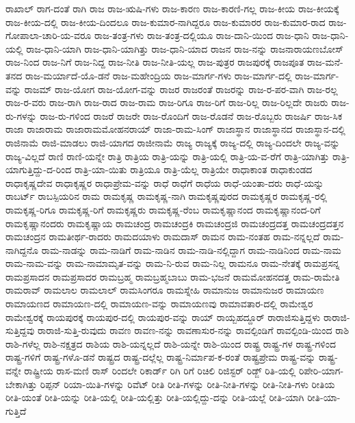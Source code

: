 {ರಾಖಾಲ್
ರಾಗ-ದಂತೆ
ರಾಗಿ
ರಾಜ
ರಾಜ-ಋಷಿ-ಗಳು
ರಾಜ-ಕಾರಣ
ರಾಜ-ಕಾರಣಿ-ಗಲ್ಲ
ರಾಜ-ಕೀಯ
ರಾಜ-ಕೀಯಕ್ಕೆ
ರಾಜ-ಕೀಯ-ದಲ್ಲಿ
ರಾಜ-ಕೀಯ-ದಿಂದಲೂ
ರಾಜ-ಕುಮಾರ-ನಾಗಿದ್ದರೂ
ರಾಜ-ಕುಮಾರರ
ರಾಜ-ಕುಮಾರ-ರಾದ
ರಾಜ-ಗೋಪಾಲಾ-ಚಾರಿ-ಯ-ವರೂ
ರಾಜ-ತಂತ್ರ-ಗಳು
ರಾಜ-ತಂತ್ರ-ದಲ್ಲಿಯೂ
ರಾಜ-ದಾನಿ-ಯಿಂದ
ರಾಜ-ಧಾನಿ
ರಾಜ-ಧಾನಿ-ಯಲ್ಲಿ
ರಾಜ-ಧಾನಿ-ಯಾಗಿ
ರಾಜ-ಧಾನಿ-ಯಾಗಿತ್ತು
ರಾಜ-ಧಾನಿ-ಯಾದ
ರಾಜನ
ರಾಜ-ನನ್ನು
ರಾಜನಾರಾಯಣಬೋಸ್
ರಾಜ-ನಿಂದ
ರಾಜ-ನಿಗೆ
ರಾಜ-ನಿದ್ದ
ರಾಜ-ನೀತಿ
ರಾಜ-ನೀತಿ-ಯಲ್ಲ
ರಾಜ-ಪುತ್ರರ
ರಾಜಪುರಕ್ಕೆ
ರಾಜಪೂತ
ರಾಜ-ಮನೆ-ತನದ
ರಾಜ-ಮರ್ಯಾದೆ-ಯೊ-ಡನೆ
ರಾಜ-ಮಹೇಂದ್ರಿಯ
ರಾಜ-ಮಾರ್ಗ-ಗಳು
ರಾಜ-ಮಾರ್ಗ-ದಲ್ಲಿ
ರಾಜ-ಮಾರ್ಗ-ವನ್ನು
ರಾಜಮ್
ರಾಜ-ಯೋಗ
ರಾಜ-ಯೋಗ-ವನ್ನು
ರಾಜರ
ರಾಜರಂತೆ
ರಾಜರನ್ನು
ರಾಜ-ರ-ಪರ-ವಾಗಿ
ರಾಜ-ರಲ್ಲ
ರಾಜ-ರ-ವರು
ರಾಜ-ರಾಗಿ
ರಾಜ-ರಾದ
ರಾಜ-ರಾಮ
ರಾಜ-ರಿಗೂ
ರಾಜ-ರಿಗೆ
ರಾಜ-ರಿಲ್ಲ
ರಾಜ-ರಿಲ್ಲದೇ
ರಾಜರು
ರಾಜ-ರು-ಗಳನ್ನು
ರಾಜ-ರು-ಗಳಿಂದ
ರಾಜರೆ
ರಾಜರೇ
ರಾಜ-ರೊಂದಿಗೆ
ರಾಜ-ರೊಡನೆ
ರಾಜ-ರೊಬ್ಬರು
ರಾಜರ್ಷಿ
ರಾಜ-ಸಿಕ
ರಾಜಾ
ರಾಜಾರಾಮ
ರಾಜಾರಾಮಮೋಹನರಾಯ್
ರಾಜಾ-ರಾಮ-ಸಿಂಗ್
ರಾಜಾಸ್ಥಾನ
ರಾಜಾಸ್ಥಾನದ
ರಾಜಾಸ್ಥಾನ-ದಲ್ಲಿ
ರಾಜಿನಾಮೆ
ರಾಜಿ-ಮಾಡಲು
ರಾಜಿ-ಯಾಗದ
ರಾಜೀನಾಮೆ
ರಾಜ್ಯ
ರಾಜ್ಯಕ್ಕೆ
ರಾಜ್ಯ-ದಲ್ಲಿ
ರಾಜ್ಯ-ದಿಂದಲೇ
ರಾಜ್ಯ-ವನ್ನು
ರಾಜ್ಯ-ವಿಲ್ಲದೆ
ರಾಣಿ
ರಾಣಿ-ಯನ್ನೇ
ರಾತ್ರಿ
ರಾತ್ರಿಯ
ರಾತ್ರಿ-ಯನ್ನು
ರಾತ್ರಿ-ಯಲ್ಲಿ
ರಾತ್ರಿ-ಯ-ವ-ರೆಗೆ
ರಾತ್ರಿ-ಯಾಗಿತ್ತು
ರಾತ್ರಿ-ಯಾಗುತ್ತಿದ್ದು-ದ-ರಿಂದ
ರಾತ್ರಿ-ಯಾ-ಯಿತು
ರಾತ್ರಿಯೂ
ರಾತ್ರಿ-ಯೆಲ್ಲ
ರಾತ್ರಿಯೇ
ರಾಧಾಕಾಂತ
ರಾಧಾಕುಂಡದ
ರಾಧಾಕೃಷ್ಣದೇವ
ರಾಧಾಕೃಷ್ಣರ
ರಾಧಾಪ್ರೇಮ-ವನ್ನು
ರಾಧೆ
ರಾಧೆಗೆ
ರಾಧೆಯ
ರಾಧೆ-ಯಂತಾ-ದರು
ರಾಧೆ-ಯನ್ನು
ರಾಬರ್ಟ್
ರಾಬಸ್ಪಿಯರಿನ
ರಾಮ
ರಾಮಕೃಷ್ಣ
ರಾಮಕೃಷ್ಣ-ನಾಗಿ
ರಾಮಕೃಷ್ಣಪುರದ
ರಾಮಕೃಷ್ಣರ
ರಾಮಕೃಷ್ಣ-ರಲ್ಲಿ
ರಾಮಕೃಷ್ಣ-ರಿಗೂ
ರಾಮಕೃಷ್ಣ-ರಿಗೆ
ರಾಮಕೃಷ್ಣರು
ರಾಮಕೃಷ್ಣ-ರೆಂಬ
ರಾಮಕೃಷ್ಣಾನಂದ
ರಾಮಕೃಷ್ಣಾನಂದ-ರಿಗೆ
ರಾಮಕೃಷ್ಣಾನಂದರು
ರಾಮಕೃಷ್ಣಾಯ
ರಾಮಚಂದ್ರ
ರಾಮಚಂದ್ರಕಿ
ರಾಮಚಂದ್ರಜಿ
ರಾಮಚಂದ್ರದತ್ತ
ರಾಮಚಂದ್ರದತ್ತನ
ರಾಮಚಂದ್ರನ
ರಾಮತೀರ್ಥ-ರಾದರು
ರಾಮದಯಾಳು
ರಾಮದಾಸ್
ರಾಮನ
ರಾಮ-ನಂತಹ
ರಾಮ-ನನ್ನಲ್ಲದೆ
ರಾಮ-ನಾಗಿದ್ದನೊ
ರಾಮ-ನಾಡನ್ನು
ರಾಮ-ನಾಡಿಗೆ
ರಾಮ-ನಾಡಿನ
ರಾಮ-ನಾಡಿ-ನಲ್ಲಿದ್ದಾಗ
ರಾಮ-ನಾಡಿನಿಂದ
ರಾಮ-ನಾಮ
ರಾಮ-ನಾಮ-ವನ್ನು
ರಾಮ-ನಾಮಾಮೃತ-ವನ್ನು
ರಾಮ-ನಿ-ರುವ
ರಾಮ-ನಿಲ್ಲ
ರಾಮನೂ
ರಾಮ-ನೇತಕ್ಕೆ
ರಾಮಪ್ರಸನ್ನ
ರಾಮಪ್ರಸಾದನ
ರಾಮಪ್ರಸಾದರ
ರಾಮಬ್ರಹ್ಮ
ರಾಮಬ್ರಹ್ಮಬಾಬು
ರಾಮ-ಭಜನೆ
ರಾಮಮೋಹನದತ್ತ
ರಾಮ-ರಾಮೇತಿ
ರಾಮರಾವ್
ರಾಮಲಾಲ
ರಾಮಲಾಲ್
ರಾಮಸಿಂಗರೂ
ರಾಮಸ್ನೇಹಿ
ರಾಮಾನುಜ
ರಾಮಾನುಜರ
ರಾಮಾಯಣ
ರಾಮಾಯಣದ
ರಾಮಾಯಣ-ದಲ್ಲಿ
ರಾಮಾಯಣ-ವನ್ನು
ರಾಮಾಯಣವು
ರಾಮಾವತಾರ-ದಲ್ಲಿ
ರಾಮೇಶ್ವರ
ರಾಮೇಶ್ವರಕ್ಕೆ
ರಾಯಪುರಕ್ಕೆ
ರಾಯಪುರ-ದಲ್ಲಿ
ರಾಯಪುರ-ವನ್ನು
ರಾಯ್
ರಾಯ್ಬಹದ್ದೂರ್
ರಾರಾಜಿಸುತ್ತಿದ್ದಳು
ರಾರಾಜಿ-ಸುತ್ತಿದ್ದವು
ರಾರಾಜಿ-ಸುತ್ತಿ-ರುವುದು
ರಾವಣ
ರಾವಣ-ನನ್ನು
ರಾವಣಾಸುರ-ನನ್ನು
ರಾವಲ್ಪಿಂಡಿಗೆ
ರಾವಲ್ಪಿಂಡಿ-ಯಿಂದ
ರಾಶಿ
ರಾಶಿ-ಗಳೆಲ್ಲ
ರಾಶಿ-ನಕ್ಷತ್ರದ
ರಾಶಿಯ
ರಾಶಿ-ಯನ್ನಲ್ಲದೆ
ರಾಶಿ-ಯನ್ನೇ
ರಾಶಿ-ಯಿಂದ
ರಾಷ್ಟ್ರ
ರಾಷ್ಟ್ರ-ಗಳ
ರಾಷ್ಟ್ರ-ಗಳಿಂದ
ರಾಷ್ಟ್ರ-ಗಳಿಗೆ
ರಾಷ್ಟ್ರ-ಗಳೊ-ಡನೆ
ರಾಷ್ಟ್ರದ
ರಾಷ್ಟ್ರ-ದಲ್ಲೆಲ್ಲ
ರಾಷ್ಟ್ರ-ನಿರ್ಮಾಪ-ಕ-ರಂತೆ
ರಾಷ್ಟ್ರಪ್ರೇಮ
ರಾಷ್ಟ್ರ-ವನ್ನು
ರಾಷ್ಟ್ರ-ವನ್ನೇ
ರಾಷ್ಟ್ರೀಯ
ರಾಸ-ಮಣಿ
ರಾಸ್
ರಿಂದಲೇ
ರಿಕಾರ್ಡ್
ರಿಗಿ
ರಿಗೆ
ರಿಚಿಲಿ
ರಿಜಿಸ್ಟರ್
ರಿಡ್ಜ್
ರಿತಿ-ಯಲ್ಲಿ
ರಿಪೇರಿ-ಯಾಗ-ಬೇಕಾಗಿತ್ತು
ರಿಪ್ಪನ್
ರಿಯಾ-ಯಿತಿ-ಗಳನ್ನು
ರಿವೆಟ್
ರೀತಿ
ರೀತಿ-ಗಳನ್ನು
ರೀತಿ-ನೀತಿ-ಗಳನ್ನು
ರೀತಿ-ನೀತಿ-ಗಳು
ರೀತಿಯ
ರೀತಿ-ಯಂತೆ
ರೀತಿ-ಯನ್ನು
ರೀತಿ-ಯಲ್ಲಿ
ರೀತಿ-ಯಲ್ಲಿತ್ತು
ರೀತಿ-ಯಲ್ಲಿದ್ದು-ದನ್ನು
ರೀತಿ-ಯಲ್ಲೆ
ರೀತಿ-ಯಾಗಿ
ರೀತಿ-ಯಾ-ಗುತ್ತಿದೆ
}
